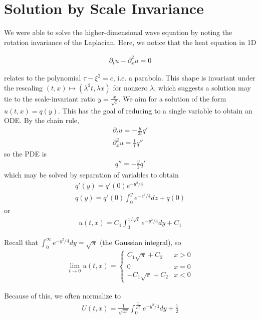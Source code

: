\documentclass{article}
\newcommand{\pd}{\partial}
\begin{document}
	
	\section{Solution by Scale Invariance}
	
	We were able to solve the higher-dimensional wave equation by noting the rotation invariance of the Laplacian. Here, we notice that the heat equation in 1D
	
	\begin{align*}
		\pd_{t}u - \pd_{x}^{2} u = 0
	\end{align*}
	
	relates to the polynomial $\tau - \xi^{2} = c$, i.e. a parabola. This shape is invariant under the rescaling $(t,x) \mapsto (\lambda^{2}t,\lambda x)$ for nonzero $\lambda$, which suggests a solution may tie to the scale-invariant ratio $y = \frac{x}{\sqrt{t}}$. We aim for a solution of the form $u(t,x) = q(y)$. This has the goal of reducing to a single variable to obtain an ODE. By the chain rule,
	\begin{align*}
		\pd_{t} u = -\frac{y}{2t} q' \\
		\pd_{x}^{2} u = \frac{1}{t} q''
	\end{align*}
	so the PDE is 
	\begin{align*}
		q'' = -\frac{y}{2} q'
	\end{align*}
	which may be solved by separation of variables to obtain
	\begin{align*}
		q'(y) = q'(0) e^{-y^{2}/4} \\
		q(y) = q'(0) \int_{0}^{y} e^{-z^{2}/4}dz + q(0)
	\end{align*}
	or 
	\begin{align*}
		u(t,x) = C_{1} \int_{0}^{x/\sqrt{t}} e^{-y^{2}/4}dy + C_{1}
	\end{align*}
	
	Recall that $\int_{0}^{\infty} e^{-y^{2}/4}dy = \sqrt{\pi}$ (the Gaussian integral), so 
	\begin{align*}
		\lim_{t \to 0} u(t,x) = \begin{cases} C_{1}\sqrt{\pi} + C_{2} & x> 0 \\ 0 & x=0 \\ -C_{1}\sqrt{\pi} + C_{2} & x< 0 \end{cases}
	\end{align*}
	
	Because of this, we often normalize to 
	\begin{align*}
		U(t,x) = \frac{1}{\sqrt{4\pi}} \int_{0}^{\frac{x}{\sqrt{t}}} e^{-y^{2}/4}dy + \frac{1}{2}
	\end{align*}
	
\end{document}
